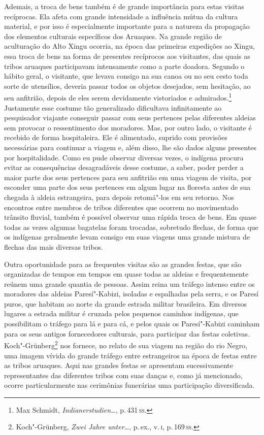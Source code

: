 Ademais, a troca de bens também é de grande importância para estas
visitas recíprocas. Ela afeta com grande intensidade a influência mútua
da cultura material, e por isso é especialmente importante para a
natureza da propagação dos elementos culturais específicos dos Aruaques.
Na grande região de aculturação do Alto Xingu ocorria, na época das
primeiras expedições ao Xingu, essa troca de bens na forma de presentes
recíprocos aos visitantes, das quais as tribos aruaques participavam
intensamente como a parte doadora. Segundo o hábito geral, o
visitante, que levava consigo na sua canoa ou no seu cesto toda sorte
de utensílios, deveria passar todos os objetos desejados, sem hesitação,
ao seu anfitrião, depois de eles serem devidamente vistoriados e
admirados.\footnote{Max Schmidt, \textit{Indianerstudien\ldots}, p.\,431\,\textsc{ss}.} Justamente esse costume tão
generalizado dificultava infinitamente ao pesquisador viajante conseguir
passar com seus pertences pelas diferentes aldeias sem provocar o
ressentimento dos moradores. Mas, por outro lado, o visitante é recebido
de forma hospitaleira. Ele é alimentado, suprido com provisões
necessárias para continuar a viagem e, além disso, lhe são dados alguns
presentes por hospitalidade. Como eu pude observar diversas vezes, o
indígena procura evitar as consequências desagradáveis desse costume, a
saber, poder perder a maior parte dos seus pertences para seu anfitrião
em uma viagem de visita, por esconder uma parte dos seus pertences em
algum lugar na floresta antes de sua chegada à aldeia estrangeira, para
depois retomá"-los em seu retorno. Nos encontros entre membros de tribos
diferentes que ocorrem no movimentado trânsito fluvial, também é
possível observar uma rápida troca de bens. Em quase todas as vezes
algumas bagatelas foram trocadas, sobretudo flechas, de forma que os
indígenas geralmente levam consigo em suas viagens uma grande mistura de
flechas das mais diversas tribos.

{Outra oportunidade para as frequentes visitas são as grandes festas,
que são organizadas de tempos em tempos em quase todas as aldeias e
frequentemente reúnem uma grande quantia de pessoas. Assim reina um
tráfego intenso entre os moradores das aldeias Paresí"-Kabizi, isoladas e
espalhadas pela serra, e os Paresí puros, que habitam ao norte da grande
estrada militar brasileira. Em diversos lugares a estrada militar é
cruzada pelos pequenos caminhos indígenas, que possibilitam o tráfego
para lá e para cá, e pelos quais os Paresí"-Kabizi caminham para os seus
antigos fornecedores culturais, para participar das festas coletivas.
Koch"-Grünberg\footnote{Koch"-Grünberg, \textit{Zwei Jahre unter\ldots}, p.\,ex., v.\,\textsc{i}, p.\,169\,\textsc{ss}.} nos fornece, no relato de sua
viagem na região do rio Negro, uma imagem vívida do grande tráfego
entre estrangeiros na época de festas entre as tribos aruaques. Aqui nas
grandes festas se apresentam sucessivamente representantes das
diferentes tribos com suas danças e, como já mencionado, ocorre
particularmente nas cerimônias funerárias uma participação
diversificada.}

